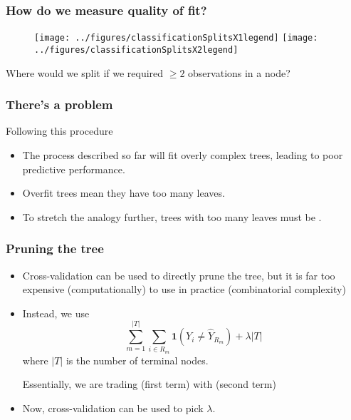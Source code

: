 \documentclass[12pt]{beamer}
\begin{document}
\begin{frame}[fragile]
\frametitle{How do we measure quality of fit?}
\begin{figure}
\centering
\texttt{[image: ../figures/classificationSplitsX1legend]} 
\texttt{[image: ../figures/classificationSplitsX2legend]}
\end{figure}
Where would we split if we required $\geq 2$ observations in a node?
\pause

\vsp
{}
\end{frame}


\begin{frame}[fragile]
\frametitle{There's a problem}
Following this procedure {\huge {}}
\vsp



\begin{itemize}
\item The process described so far will fit overly complex trees, leading to poor predictive performance.
\item Overfit trees mean they have too many leaves.
\item To stretch the analogy further, trees with too many leaves must be .
\end{itemize}
\end{frame}

\begin{frame}[fragile]
\frametitle{Pruning the tree}

\begin{itemize}
\item Cross-validation can be used to directly prune the tree, but it is far too expensive (computationally) to use in practice 
(combinatorial complexity)
\item Instead, we use 
\[
\sum_{m=1}^{|T|} \sum_{i \in R_m} \mathbf{1}(Y_i \neq \hat Y_{R_m}) + \lambda |T|
\]
where $|T|$ is the number of terminal nodes.  

\vsp
Essentially, we are trading  (first term) with  (second term)

\item Now, cross-validation can be used to pick $\lambda$.
\end{itemize}
\end{frame}
\end{document}
